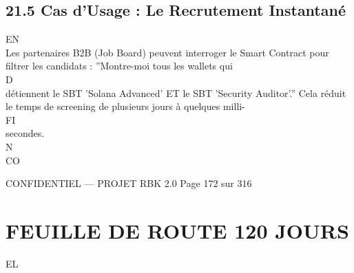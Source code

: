 \subsection{21.5 Cas d’Usage : Le Recrutement Instantané}
\vspace{0.5em}
\vspace{0.5em}
\vspace{0.5em}
\vspace{0.5em}
EN\\
Les partenaires B2B (Job Board) peuvent interroger le Smart Contract pour filtrer les candidats : ”Montre-moi tous les wallets qui\\
\vspace{0.5em}
\vspace{0.5em}
\vspace{0.5em}
\vspace{0.5em}
D\\
détiennent le SBT ’Solana Advanced’ ET le SBT ’Security Auditor’.” Cela réduit le temps de screening de plusieurs jours à quelques milli-\\
\vspace{0.5em}
\vspace{0.5em}
\vspace{0.5em}
\vspace{0.5em}
FI\\
secondes.\\
\vspace{0.5em}
\vspace{0.5em}
N\\
CO\\
\vspace{0.5em}
\vspace{0.5em}
\vspace{0.5em}
\vspace{0.5em}
\begin{confidential}CONFIDENTIEL — PROJET RBK 2.0                               Page 172 sur 316\end{confidential}
\section{FEUILLE DE ROUTE 120 JOURS}
\vspace{0.5em}
\vspace{0.5em}
\vspace{0.5em}
\vspace{0.5em}
EL\\
